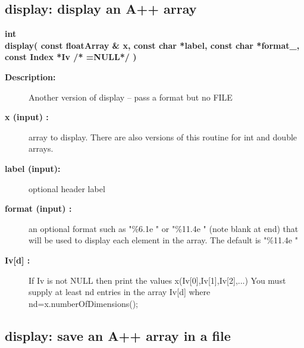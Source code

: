 \subsection{display: display an A++ array}
 
\newlength{\displayIncludeArgIndent}
\begin{flushleft} \textbf{%
int \\ 
\settowidth{\displayIncludeArgIndent}{display(}%
display( const floatArray \& x, const char *label, const char *format\_, const Index *Iv /* =NULL*/ )
}\end{flushleft}
\begin{description}
\item[{\bf Description:}] 
      Another version of display -- pass a format but no FILE
\item[{\bf x (input) :}]  array to display. There are also versions of this routine for int and double arrays.
\item[{\bf label (input):}]  optional header label
\item[{\bf format (input) :}]  an optional format such as "\%6.1e " or "\%11.4e " (note blank at end) 
  that will be used to display each element in the array. The default is "\%11.4e "
\item[{\bf Iv[d] :}]  If Iv is not NULL then print the values x(Iv[0],Iv[1],Iv[2],...) You must supply at
   least nd entries in the array Iv[d] where nd=x.numberOfDimensions();
\end{description}
\subsection{display: save an A++ array in a file}
 
